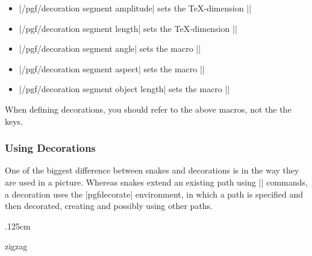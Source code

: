 \begin{itemize}
	\item |/pgf/decoration segment amplitude| 
		sets the \TeX-dimension |\pgfdecorationsegmentamplitude|
		
	\item |/pgf/decoration segment length| 
		sets the \TeX-dimension |\pgfdecorationsegmentlength|
		
	\item |/pgf/decoration segment angle| 
		sets the macro |\pgfdecorationsegmentangle|
		
	\item |/pgf/decoration segment aspect| 
		sets the macro |\pgfdecorationsegmentaspect|
		
	\item |/pgf/decoration segment object length| 
		sets the macro |\pgfdecorationsegmentobjectlength|
\end{itemize}

When defining decorations, you should refer to the above macros, 
not the the keys.


\subsubsection{Using Decorations}

One of the biggest difference between snakes and decorations
is in the way they are used in a picture. Whereas snakes
extend an existing path using |\pgfpath| commands, a decoration 
uses the |{pgfdecorate}| environment, in which a path is specified 
and then decorated, creating and possibly using other paths. 


\begin{codeexample}[]
\begin{pgfpicture}
  \pgfdecorationsegmentlength.125cm
  \begin{pgfdecoration}{{zigzag}{\pgfdecoratedpathlength}}
    \pgfpathmoveto{\pgfpoint{1.5cm}{1cm}}
  \end{pgfdecoration}
\end{pgfpicture}
\end{codeexample}

